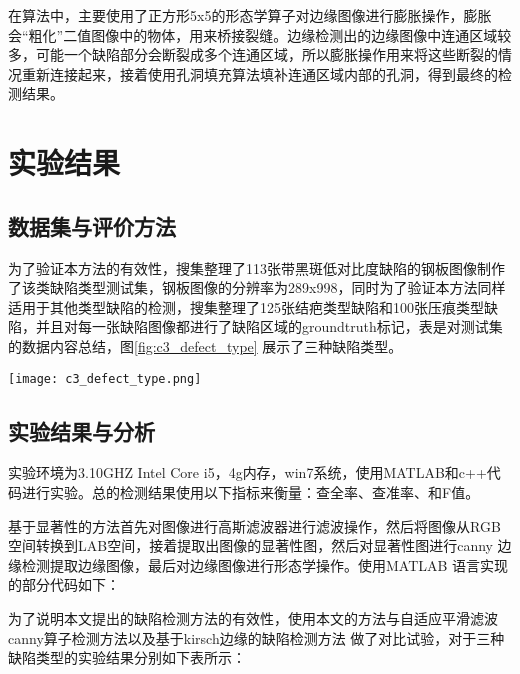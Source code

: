     在算法中，主要使用了正方形5x5的形态学算子对边缘图像进行膨胀操作，膨胀会“粗化”二值图像中的物体，用来桥接裂缝。边缘检测出的边缘图像中连通区域较多，可能一个缺陷部分会断裂成多个连通区域，所以膨胀操作用来将这些断裂的情况重新连接起来，接着使用孔洞填充算法填补连通区域内部的孔洞，得到最终的检测结果。

    \section{实验结果}
        \subsection{数据集与评价方法}
        为了验证本方法的有效性，搜集整理了113张带黑斑低对比度缺陷的钢板图像制作了该类缺陷类型测试集，钢板图像的分辨率为289x998，同时为了验证本方法同样适用于其他类型缺陷的检测，搜集整理了125张结疤类型缺陷和100张压痕类型缺陷，并且对每一张缺陷图像都进行了缺陷区域的groundtruth标记，表是对测试集的数据内容总结，图\ref{fig:c3_defect_type} 展示了三种缺陷类型。

        \begin{figure*}[!h]
        \centering
        \texttt{[image: c3\_defect\_type.png]}
        \caption{三种不同的缺陷类型，从左至右以及为结疤、压痕和带黑斑低对比度缺陷}
        \label{fig:c3_defect_type}
        \end{figure*}

        \subsection{实验结果与分析}
        实验环境为3.10GHZ Intel Core i5，4g内存，win7系统，使用MATLAB和c++代码进行实验。总的检测结果使用以下指标来衡量：查全率、查准率、和F值。

        基于显著性的方法首先对图像进行高斯滤波器进行滤波操作，然后将图像从RGB 空间转换到LAB空间，接着提取出图像的显著性图，然后对显著性图进行canny 边缘检测提取边缘图像，最后对边缘图像进行形态学操作。使用MATLAB 语言实现的部分代码如下：

        

        为了说明本文提出的缺陷检测方法的有效性，使用本文的方法与自适应平滑滤波canny算子检测方法\cite{Canny1986A}以及基于kirsch边缘的缺陷检测方法\cite{李伟2016热态高速线材表面缺陷检测系统研究与实现} 做了对比试验，对于三种缺陷类型的实验结果分别如下表所示：

